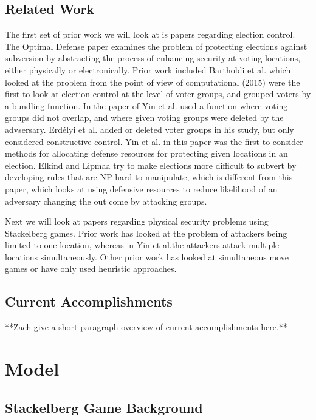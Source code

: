 \documentclass[letterpaper]{article} %
\begin{document}
\subsection{Related Work}

The first set of prior work we will look at is papers regarding election control. The Optimal Defense paper examines the problem of protecting elections against subversion by abstracting the process of enhancing security at voting locations, either physically or electronically. Prior work included Bartholdi et al. which looked at the problem from the point of view of computational (2015) were the first to look at election control at the level of voter groups, and grouped voters by a bundling function. In the paper of Yin et al. used a function where voting groups did not overlap, and where given voting groups were deleted by the advsersary. Erdélyi et al. added or deleted voter groups in his study, but only considered constructive control.  Yin et al. in this paper was the first to consider methods for allocating defense resources for protecting given locations in an election. Elkind and Lipmaa try to make elections more difficult to subvert by developing rules that are NP-hard to manipulate, which is different from this paper, which looks at using defensive resources to reduce likelihood of an adversary changing the out come by attacking groups.

Next we will look at papers regarding physical security problems using Stackelberg games. Prior work has looked at the problem of attackers being limited to one location, whereas in Yin et al.the attackers attack multiple locations simultaneously. Other prior work has looked at simultaneous move games or have only used heuristic approaches.

\subsection{Current Accomplishments}
**Zach give a short paragraph overview of current accomplishments here.**

\section{Model}
\subsection{Stackelberg Game Background}
\end{document}
